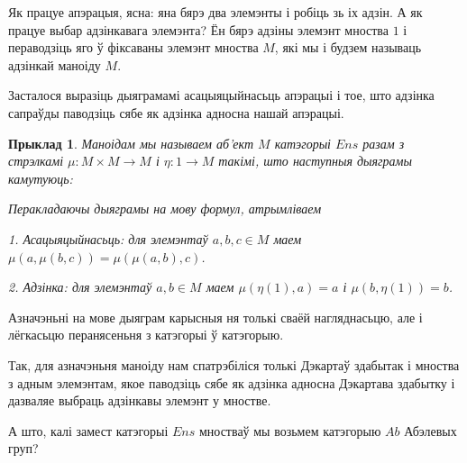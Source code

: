 \documentclass[a4paper,12pt]{book}
\newtheorem{example}{Прыклад}[section]
\begin{document}
Як працуе апэрацыя, ясна: яна бярэ два элемэнты і робіць зь іх
адзін. А як працуе выбар адзінкавага элемэнта? Ён бярэ адзіны
элемэнт мноства $1$ і пераводзіць яго ў фіксаваны элемэнт мноства
$M$, які мы і будзем называць адзінкай маноіду $M$.

Засталося выразіць дыяграмамі асацыяцыйнасьць апэрацыі і тое, што
адзінка сапраўды паводзіць сябе як адзінка адносна нашай апэрацыі.

\begin{example}
  Маноідам мы называем аб'ект $M$ катэгорыі $Ens$ разам з стрэлкамі
  $\mu: M \times M \rightarrow M$ і $\eta: 1 \rightarrow M$ такімі,
  што наступныя дыяграмы камутуюць:



  Перакладаючы дыяграмы на мову формул, атрымліваем

  1. Асацыяцыйнасьць: для элемэнтаў $a, b, c \in M$ маем $\mu(a,
  \mu(b, c)) = \mu(\mu(a, b), c)$.

  2. Адзінка: для элемэнтаў $a, b \in M$ маем $\mu(\eta(1), a) = a$
  і $\mu(b, \eta(1)) = b$.
\end{example}

Азначэньні на мове дыяграм карысныя ня толькі сваёй нагляднасьцю,
але і лёгкасьцю перанясеньня з катэгорыі ў катэгорыю.

Так, для азначэньня маноіду нам спатрэбіліся толькі Дэкартаў
здабытак і мноства з адным элемэнтам, якое паводзіць сябе як
адзінка адносна Дэкартава здабытку і дазваляе выбраць адзінкавы
элемэнт у мностве.

А што, калі замест катэгорыі $Ens$ мностваў мы возьмем катэгорыю
$Ab$ Абэлевых груп?
\end{document}
